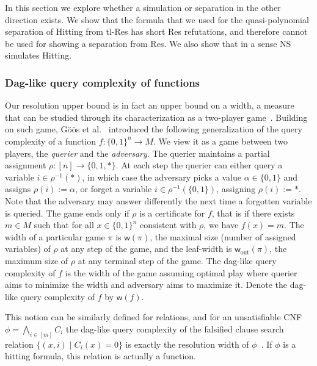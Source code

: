 \documentclass[11pt]{article}
\newcommand{\scterm}[1]{{\textrm{\sc #1}}}
\newcommand{\hit}{\scterm{Hitting}}
\newcommand{\tres}{\scterm{tl-Res}}
\newcommand{\res}{\scterm{Res}}
\newcommand{\ns}{\scterm{NS}}
\newcommand{\dagw}{\mathsf{w}}
\newcommand{\leafw}{\dagw_{\mathrm{out}}}
\numberwithin{equation}{section}
\begin{document}
In this section we explore whether a simulation or separation in the other direction exists. We show that the formula that we used for the quasi-polynomial
separation of {\hit} from {\tres} has short {\res} refutations, and therefore cannot be used
for showing a separation from {\res}.
We also show that in a sense {\ns} simulates {\hit}.

\subsubsection{Dag-like query complexity of functions}\label{sec:dag-like-query} %


Our resolution upper bound is in fact an upper bound on a width, a measure that can be studied through its characterization as a two-player game~\cite{Pud00,AD08}.
%
Building on such game, Göös et al.~\cite{GGKS20} introduced the following generalization of the query complexity of a function $f\colon \{0,1\}^n \to M$. We view it as a game between two players, the \emph{querier} and the \emph{adversary}. The querier maintains a partial assignment $\rho\colon [n] \to \{0,1,*\}$. At each step the querier can either query a variable $i \in \rho^{-1}(*)$, in which case the adversary picks a value $\alpha \in \{0,1\}$ and assigns $\rho(i) := \alpha$, or forget a variable $i \in \rho^{-1}(\{0,1\})$, assigning $\rho(i) := *$. Note that the adversary may answer differently the next time a forgotten variable is queried. The game ends only if $\rho$ is a certificate for $f$, that is if there exists $m \in M$ such that for all $x \in \{0,1\}^n$ consistent with $\rho$, we have $f(x) = m$. The width of a particular game $\pi$ is $\dagw(\pi)$, the maximal size (number of assigned variables) of $\rho$ at any step of the game, and the leaf-width is $\leafw(\pi)$, the maximum size of $\rho$ at any terminal step of the game.
The dag-like query complexity of $f$ is the width of the game assuming optimal play where querier aims to minimize the width and adversary aims to maximize it. Denote the dag-like query complexity of $f$ by $\dagw(f)$.

This notion can be similarly defined for relations, and for an unsatisfiable CNF $\phi = \bigwedge_{i\in [m]} C_i$ the dag-like query complexity of the falsified clause search relation $\{(x, i) \mid C_i(x) = 0\}$ is exactly the resolution width of $\phi$~\cite{AD08}. If $\phi$ is a hitting formula, this relation is actually a function.
\end{document}

